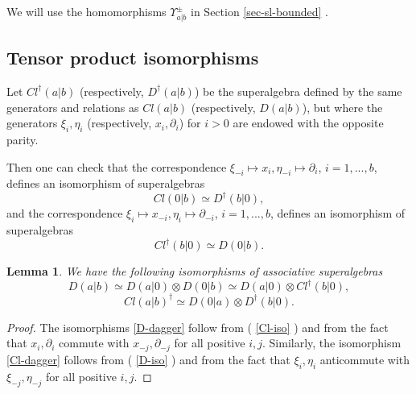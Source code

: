 \documentclass[12pt]{amsart}
\makeatletter
\def\@putname#1#2#3#4{\def\@@ref{#3}\let\old@bf\bf
        \def\bf##1{\old@bf\if?\noexpand##1?{#4}\else##1\fi}%
	#1{#2}%
        \let\bf\old@bf}
\def\@putname#1#2#3#4{\def\@@ref{#3}\let\old@bf\bf	%
	\let\old@reset@font\reset@font			%
        \def\bf##1{\old@bf\if?\noexpand##1?{#4}\else##1\fi}%
	\def\reset@font##1##2{\old@reset@font##1\if?\noexpand##2?{#4}\else##2\fi}#1{#2}%
        \let\bf\old@bf\let\reset@font\old@reset@font}
\let\my@ref=\ref
\def\ref#1{\@putname\my@ref{#1}{#1}{\tiny\rm\@@ref}}
\theoremstyle{plain} %
\numberwithin{equation}{section}
\theoremstyle{definition}
\theoremstyle{remark}
\theoremstyle{plain} %
\newtheorem{lemma}[definition]{Lemma}
\makeatother
\begin{document}
      We will use the homomorphisms $\Upsilon^\pm_{a|b}$  in Section \ref{sec-sl-bounded}. 
      
      
           \subsection{Tensor product isomorphisms}      
           Let $Cl^\dagger(a|b)$ (respectively, $D^\dagger(a|b)$) be the superalgebra defined by the same generators and relations as $Cl(a|b)$  (respectively, $D(a|b)$), but where the generators $\xi_i, \eta_i$ (respectively, $x_i, \partial_i$) for $i>0$ are endowed with  the opposite parity. 
                      
           Then one can check  that the correspondence $\xi_{-i} \mapsto x_i, \eta_{-i} \mapsto \partial_i$, $i=1,...,b$, defines an isomorphism of superalgebras
           \begin{equation}\label{D-iso}
             Cl(0|b)\simeq D^\dagger(b|0),
           \end{equation}
           and the correspondence $\xi_{i} \mapsto x_{-i}, \eta_{i} \mapsto \partial_{-i}$, $i=1,...,b$, defines an isomorphism of superalgebras
       \begin{equation}\label{Cl-iso}    
         Cl^\dagger(b|0)\simeq D(0|b).
         \end{equation}
      
      \begin{lemma}\label{isomorphism_tensor} We have the following isomorphisms of associative superalgebras
                   \begin{equation}\label{D-dagger}
                   D(a|b)\simeq D(a|0)\otimes D(0|b)\simeq D(a|0)\otimes Cl^\dagger(b|0),
                   \end{equation}
      \begin{equation}\label{Cl-dagger} Cl(a|b)^\dagger\simeq D(0|a)\otimes D^\dagger(b|0).
          \end{equation}
    
      \end{lemma}
      \begin{proof}  The isomorphisms \eqref{D-dagger} follow from (\ref{Cl-iso}) and from the fact that $x_i,\partial_i$ commute with $x_{-j},\partial_{-j}$ for all positive $i,j$. Similarly, the  isomorphism \eqref{Cl-dagger} follows from  (\ref{D-iso}) and from the fact that $\xi_i,\eta_i$ anticommute with $\xi_{-j},\eta_{-j}$ for all positive $i,j$. 
   \end{proof}
   
\end{document}

